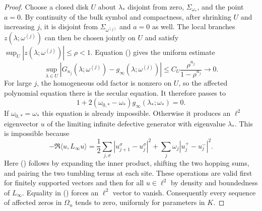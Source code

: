 \documentclass[twoside,10pt]{article}
\numberwithin{equation}{section}
\theoremstyle{slbody}
\theoremstyle{definition}
\theoremstyle{remark}
\renewcommand{\eqref}[1]{%
  \textup{{\normalfont(\oldstylenums{\ref{#1}}}\normalfont)}}
\begin{document}
\begin{proof}
Choose a closed disk $U$ about $\lambda_*$ disjoint from zero,
$\Sigma_{\omega_*}$, and the point $a=0$.  By continuity of the bulk
symbol and compactness, after shrinking $U$ and increasing $j$, it is
disjoint from $\Sigma_{\omega^{(j)}}$ and $a=0$ as well.  The local
branches $z(\lambda;\omega^{(j)})$ can then be chosen jointly on $U$ and
satisfy $\sup_U|z(\lambda;\omega^{(j)})|\le\rho<1$.  Equation
\eqref{eq:finite-green-error} gives the uniform estimate
\[
 \sup_{\lambda\in U}
 |G_{n_j}(\lambda;\omega^{(j)})
      -g_\infty(\lambda;\omega^{(j)})|
 \le C_U\frac{\rho^{n_j}}{1-\rho^{n_j}}\longrightarrow0.
\]
For large $j$, the homogeneous odd factor is nonzero on $U$, so the
affected polynomial equation there is the secular equation.  It
therefore passes to
\[
 1+2(\omega_{0,*}-\omega_*)
     g_\infty(\lambda_*;\omega_*)=0.
\]
If $\omega_{0,*}=\omega_*$ this equation is already impossible.
Otherwise it produces an $\ell^2$ eigenvector $u$ of the limiting
infinite defective generator with eigenvalue $\lambda_*$.  This is
impossible because
\begin{equation}\label{eq:infinite-dissipation}
 -\Re\langle u,L_\infty u\rangle
 =\frac12\sum_{j,\sigma}|u_{j+1}^\sigma-u_j^\sigma|^2
   +\sum_j\omega_j|u_j^+-u_j^-|^2.
\end{equation}
Here \eqref{eq:infinite-dissipation} follows by expanding the inner
product, shifting the two hopping sums, and pairing the two tumbling
terms at each site.  These operations are valid first for finitely
supported vectors and then for all $u\in\ell^2$ by density and
boundedness of $L_\infty$.
Equality in \eqref{eq:infinite-dissipation} forces an $\ell^2$ vector to
vanish.  Consequently every sequence of affected zeros in $\Omega_n$
tends to zero, uniformly for parameters in $K$.


\end{proof}
\end{document}
